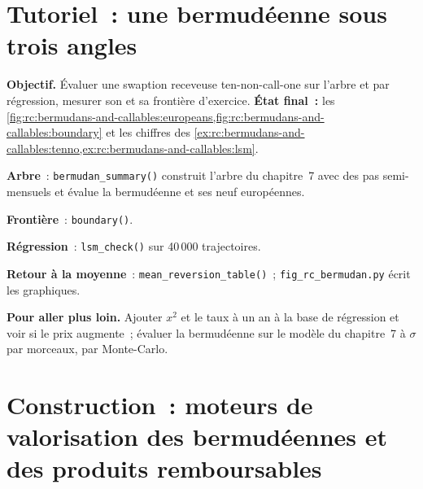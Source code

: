 \section{Tutoriel~: une bermudéenne sous trois angles}\label{tut:rc:bermudans-and-callables:tutorial}

\begin{tutorial}
\textbf{Objectif.} Évaluer une swaption receveuse ten-non-call-one sur l'arbre et par régression,
mesurer son  et sa frontière d'exercice. \textbf{État final~:}
les \cref{fig:rc:bermudans-and-callables:europeans,fig:rc:bermudans-and-callables:boundary}
et les chiffres des \cref{ex:rc:bermudans-and-callables:tenno,ex:rc:bermudans-and-callables:lsm}.
\begin{tutsteps}
\item \textbf{Arbre}~: \texttt{bermudan\_summary()} construit l'arbre du chapitre~7 avec
des pas semi-mensuels et évalue la bermudéenne et ses neuf européennes.
\item \textbf{Frontière}~: \texttt{boundary()}.
\item \textbf{Régression}~: \texttt{lsm\_check()} sur 40\,000 trajectoires.
\item \textbf{Retour à la moyenne}~: \texttt{mean\_reversion\_table()}~;
\texttt{fig\_rc\_bermudan.py} écrit les graphiques.
\end{tutsteps}
\textbf{Pour aller plus loin.} Ajouter $x^2$ et le taux à un an à la
base de régression et voir si le prix augmente~; évaluer la bermudéenne sur le
modèle du chapitre~7 à $\sigma$ par morceaux, par Monte-Carlo.
\end{tutorial}

\section{Construction~: moteurs de valorisation des bermudéennes et des produits remboursables}\label{bld:rc:bermudans-and-callables:bermudan}

